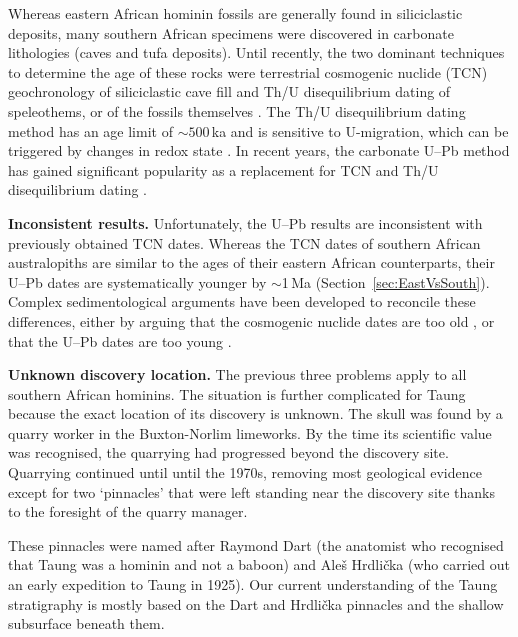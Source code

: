 \documentclass[11pt]{article}
\begin{document}
Whereas eastern African hominin fossils are generally found in
siliciclastic deposits, many southern African specimens were
discovered in carbonate lithologies (caves and tufa deposits).  Until
recently, the two dominant techniques to determine the age of these
rocks were terrestrial cosmogenic nuclide (TCN) geochronology of
siliciclastic cave fill \citep[e.g.,][]{partridge2003, granger2015,
  kramers2017, granger2022} and Th/U disequilibrium dating of
speleothems, or of the fossils themselves \citep[e.g.,][]{vogel1984,
  grun2023}. The Th/U disequilibrium dating method has an age limit of
$\sim{500}\,$ka and is sensitive to U-migration, which can be
triggered by changes in redox state \citep{tobias1993,ivanovich1994}.
In recent years, the carbonate U--Pb method has gained significant
popularity as a replacement for TCN and Th/U disequilibrium dating
\citep{walker2006,dirks2010,pickering2019}.

\textbf{Inconsistent results.} Unfortunately, the U--Pb results are
inconsistent with previously obtained TCN dates. Whereas the TCN dates
of southern African australopiths are similar to the ages of their
eastern African counterparts, their U--Pb dates are systematically
younger by $\sim$1\,Ma (Section~\ref{sec:EastVsSouth}). Complex
sedimentological arguments have been developed to reconcile these
differences, either by arguing that the cosmogenic nuclide dates are
too old \citep{kramers2017}, or that the U--Pb dates are too young
\citep{bruxelles2019,granger2022}.

\textbf{Unknown discovery location.} The previous three problems apply
to all southern African hominins. The situation is further complicated
for Taung because the exact location of its discovery is unknown.  The
skull was found by a quarry worker \citep[`Mr. de
  Bruyn';][]{tobias1984, tobias2000} in the Buxton-Norlim
limeworks. By the time its scientific value was recognised, the
quarrying had progressed beyond the discovery site. Quarrying
continued until until the 1970s, removing most geological evidence
except for two `pinnacles' that were left standing near the discovery
site thanks to the foresight of the quarry manager.

These pinnacles were named after Raymond Dart (the anatomist who
recognised that Taung was a hominin and not a baboon) and Ale\v{s}
Hrdli\v{c}ka (who carried out an early expedition to Taung in
1925). Our current understanding of the Taung stratigraphy is mostly
based on the Dart and Hrdli\v{c}ka pinnacles and the shallow
subsurface beneath them.
\end{document}
